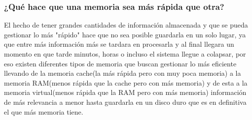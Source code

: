\documentclass{article}
\begin{document}
\subsubsection{¿Qué hace que una memoria sea más rápida que otra?}
{\raggedleft
El hecho de tener grandes cantidades de información almacenada y que se pueda gestionar lo más "rápido" hace que no sea posible guardarla en un solo lugar, ya que entre más información más se tardara en procesarla y al final llegara un momento en que tarde minutos, horas o incluso el sistema llegue a colapsar, por eso existen diferentes tipos de memoria que buscan gestionar lo más eficiente llevando de la memoria cache(la más rápida pero con muy poca memoria) a la memoria RAM(menos rápida que la cache pero con más memoria) y de esta a la memoria virtual(menos rápida que la RAM pero con más memoria) información de más relevancia a menor hasta guardarla en un disco duro que es en definitiva el que más memoria tiene.
}
\newpage


\end{document}
